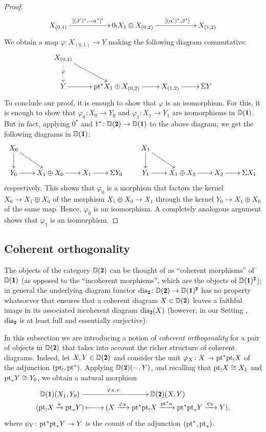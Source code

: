 \begin{proof}
\[
\xymatrix@C=2cm{ X_{(0,1)} \ar[r]^(.4){[(\beta')^*,-\alpha^*]^t} & 0_!X_1 \oplus X_{(0,2)} \ar[r]^(.6){[(\alpha')^*,\beta^*]} & X_{(1,2)}}
\]
We obtain a map $\varphi\colon X_{(0,1)}\to Y$ making the following diagram commutative:
\[
\xymatrix{
X_{(0,1)}\ar[dr]\ar@{.>}[d]|{\varphi}\\
Y\ar[r]& \pt^* X_1\oplus X_{(0,2)}\ar[r]& X_{(1,2)}\ar[r]& \Sigma Y
}
\]
To conclude our proof, it is enough to show that $\varphi$ is an isomorphism. For this, it is enough to show that $\varphi_0\colon X_0\to Y_0$ and $\varphi_1\colon X_1\to Y_1$ are isomorphisms in $\D(\uno)$. 
But in fact, applying $0^*$ and $1^*\colon \D(\due)\to \D(\uno)$ to the above diagram, we get the following diagrams in $\D(\uno)$:
\[
\xymatrix@C=20pt@R=20pt{
X_0\ar[d]\ar[dr]&&&       &           X_1\ar[d]\ar[rd]\\
Y_0\ar[r]& X_1\oplus X_0\ar[r]& X_1\ar[r]& \Sigma Y_0        &       Y_1\ar[r]& X_1\oplus X_2\ar[r]& X_2\ar[r]& \Sigma X_1
}
\]
respectively. This shows that $\varphi_0$ is a morphism that factors the kernel $X_0\to X_1\oplus X_0$ of the morphism $X_1\oplus X_0\to X_1$ through the kernel $Y_0\to X_1\oplus X_0$ of the same map. Hence, $\varphi_0$ is an isomorphism. A completely analogous argument shows that $\varphi_1$ is an isomorphism.
\end{proof}





\subsection{Coherent orthogonality}\label{Subs_Coh_Ort}
The objects of the category $\D(\due)$ can be thought of as ``coherent morphisms'' of $\D(\uno)$ (as opposed to the ``incoherent morphisms'', which are the objects of $\D(\uno)^{\due}$); in general the underlying diagram functor $\dia_\due \colon \D(\due)\to \D(\uno)^\due$ has no property whatsoever that ensures that a coherent diagram $X\in\D(\due)$ leaves a faithful image in its associated incoherent diagram $\dia_\due(X)$ (however, in our Setting , $\dia_\due$ is at least full and essentially surjective).

In this subsection we are introducing a notion of \emph{coherent orthogonality} for a pair of objects in $\D(\due)$ that takes into account the richer structure of coherent diagrams. Indeed, let $X, Y\in\D(\due)$ and consider the unit $\varphi_X\colon X\to \text{pt}^*\text{pt}_!X$ of the adjunction $(\text{pt}_!,\text{pt}^*)$. Applying $\D(\due)(-,Y)$, and recalling that $\text{pt}_!X\cong X_1$ and $\text{pt}_*Y\cong Y_0$, we obtain a natural morphism
\[
\xymatrix@R=0pt{\D(\uno)(X_1,Y_0)\ar[r]^{\varphi_{X,Y}}&\D(\due)(X,Y)\\
(\pt_!X\xto{a} \pt_*Y)\ar@{|->}[r]&(X\xto{\varphi_X} \pt^*\pt_!X\xto{\pt^*a} \pt^*\pt_*Y\xto{\psi_Y} Y),}
\]
where $\psi_Y\colon\text{pt}^*\text{pt}_*Y\to Y$ is the counit of the adjunction $(\text{pt}^*,\text{pt}_*)$.


